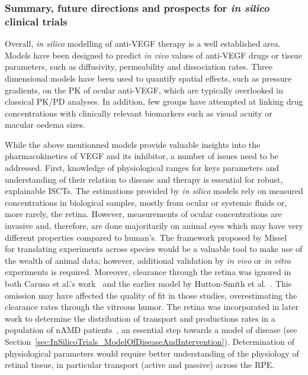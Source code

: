 \documentclass{article}
\begin{document}
\subsubsection{Summary, future directions and prospects for \textit{in silico} clinical trials} \label{sec:SummaryAntiVEGF}
Overall, \textit{in silico} modelling of anti-VEGF therapy is a well established area.
Models have been designed to predict \textit{in vivo} values of anti-VEGF drugs or tissue parameters, such as diffusivity, permeability and dissociation rates.
Three dimensional models have been used to quantify spatial effects, such as pressure gradients, on the PK of ocular anti-VEGF, which are typically overlooked in classical PK/PD analyses.
In addition, few groups have attempted at linking drug concentrations with clinically relevant biomarkers such as visual acuity or macular oedema sizes.

While the above mentionned models provide valuable insights into the pharmacokinetics of VEGF and its inhibitor, a number of issues need to be addressed.
First, knowledge of physiological ranges for keys parameters and understanding of their relation to disease and therapy is essential for robust, explainable ISCTs.
The estimations provided by \textit{in silico} models rely on measured concentrations in biological samples, mostly from ocular or systemic fluids or, more rarely, the retina.
However, measurements of ocular concentrations are invasive and, therefore, are done majoritarily on animal eyes which may have very different properties compared to human's.
The framework proposed by Missel~\cite{Missel_2012} for translating experiments across species would be a valuable tool to make use of the wealth of animal data; however, additional validation by \textit{in vivo} or \textit{in vitro} experiments is required.
Moreover, clearance through the retina was ignored in both Caruso et al.'s work~\cite{Caruso_2020} and the earlier model by Hutton-Smith et al.~\cite{HuttonSmith_2016}.
This omission may have affected the quality of fit in those studies, overestimating the clearance rates through the vitreous humor.
The retina was incorporated in later work to determine the distribution of transport and productions rates in a population of nAMD patients~\cite{HuttonSmith_2017, HuttonSmith_2018}, an essential step towards a model of disease (see Section~\ref{sec:InSilicoTrials_ModelOfDiseaseAndIntervention}).
Determination of physiological parameters would require better understanding of the physiology of retinal tissue, in particular transport (active and passive) across the RPE.
\end{document}
